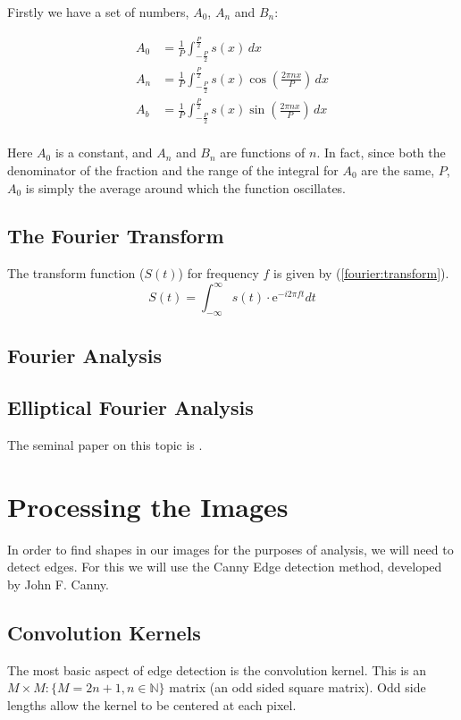 \documentclass[12pt,english]{article}
\begin{document}
Firstly we have a set of numbers, \(A_0\), \(A_n\) and \(B_n\):

\begin{equation}
\begin{aligned}
	A_0 &= \frac{1}{P} \int_{-\frac{P}{2}}^{\frac{P}{2}}
		s(x) \,dx \\
	A_n &= \frac{1}{P} \int_{-\frac{P}{2}}^{\frac{P}{2}}
		s(x) \cos \left(\frac{2\pi nx}{P}\right) \,dx \\
	A_b &= \frac{1}{P} \int_{-\frac{P}{2}}^{\frac{P}{2}}
		s(x) \sin \left(\frac{2\pi nx}{P}\right) \,dx \\
\end{aligned}
\end{equation}

Here \(A_0\) is a constant, and \(A_n\) and \(B_n\) are functions of \(n\).
In fact, since both the denominator of the fraction and the range of the integral for \(A_0\) are the same, \(P\),
\(A_0\) is simply the average around which the function oscillates.


\subsection{The Fourier Transform}
The transform function ($S(t)$) for frequency $f$ is given by
(\ref{fourier:transform}).
\begin{equation} \label{fourier:transform}
	S(t)=\int_{-\infty}^{\infty}s(t)\cdot \mathrm{e}^{-i2\pi ft} dt
\end{equation}

\subsection{Fourier Analysis}

\subsection{Elliptical Fourier Analysis}
The seminal paper on this topic is \cite{kuhl:1982}.

\section{Processing the Images}
In order to find shapes in our images for the purposes of analysis,
we will need to detect edges. For this we will use the Canny Edge
detection method, developed by John F. Canny.

\subsection{Convolution Kernels}
The most basic aspect of edge detection is the convolution kernel.
This is an $M{\times}M: \{M=2n+1, n\in\mathbb{N}\}$ matrix
(an odd sided square matrix).
Odd side lengths allow the kernel to be centered at each pixel.
\end{document}
